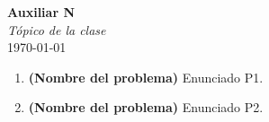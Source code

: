 \documentclass{article}
\begin{document}


\begin{center}
    \Huge{\textbf{Auxiliar N}}\\
    \textit{\large{Tópico de la clase}}\\
    \normalsize
	\today
\end{center}

\begin{enumerate}
    \item \textbf{(Nombre del problema)} Enunciado P1.

    \item \textbf{(Nombre del problema)} Enunciado P2.
		
\end{enumerate}
\end{document}
